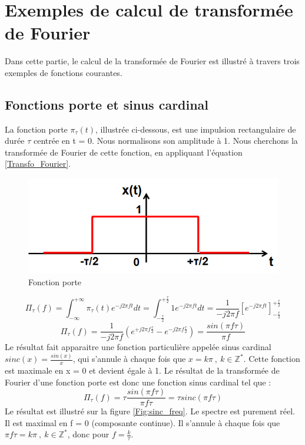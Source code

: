 	\section{Exemples de calcul de transformée de Fourier}
	
	Dans cette partie, le calcul de la transformée de Fourier est illustré à travers trois exemples de fonctions courantes.
	
	\subsection{Fonctions porte et sinus cardinal}
	La fonction porte $\pi_{\tau}(t)$, illustrée ci-dessous, est une impulsion rectangulaire de durée $\tau$ centrée en t = 0. Nous normalisons son amplitude à 1. Nous cherchons la transformée de Fourier de cette fonction, en appliquant l'équation \ref{Transfo_Fourier}.
	
	\begin{figure}[h!]
		\centering
		\includegraphics[scale=0.5]{images/Porte_Temporel.png}
		\caption{Fonction porte}	
		\label{Fig:Porte_temporel} 
	\end{figure}

	\begin{equation*}
	\Pi_{\tau}(f)=\int_{-\infty}^{+\infty}\pi_{\tau}(t)e^{-j2\pi ft}dt=\int_{-\frac{\tau}{2}}^{+\frac{\tau}{2}}1e^{-j2\pi ft}dt=\frac{1}{-j2\pi f}[e^{-j2\pi ft}]_{-\frac{\tau}{2}}^{+\frac{\tau}{2}}
	\end{equation*}
	\begin{equation*}
	\Pi_{\tau}(f)=\frac{1}{-j2\pi f}(e^{+j2\pi f\frac{\tau}{2}}-e^{-j2\pi f\frac{\tau}{2}})=\frac{sin(\pi f\tau)}{\pi f}
	\end{equation*}
	Le résultat fait apparaitre une fonction particulière appelée sinus cardinal $sinc(x)=\frac{sin(x)}{x}$, qui s'annule à chaque fois que $x=k\pi~,~k \in \mathbb{Z^{*}}$. Cette fonction est maximale en x = 0 et devient égale à 1. Le résultat de la transformée de Fourier d'une fonction porte est donc une fonction sinus cardinal tel que :
	\begin{equation}\label{TF_porte}
	\Pi_{\tau}(f)=\tau\frac{sin(\pi f\tau)}{\pi f \tau}=\tau sinc(\pi f \tau)
	\end{equation}
	Le résultat est illustré sur la figure \ref{Fig:sinc_freq}. Le spectre est purement réel. Il est maximal en f = 0 (composante continue). Il s'annule à chaque fois que  $\pi f \tau=k\pi~,~k \in \mathbb{Z^{*}}$, donc pour $f=\frac{k}{\tau}$.\\
	
